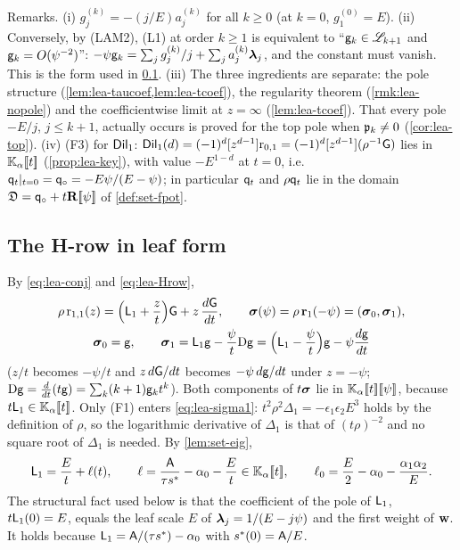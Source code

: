 Remarks. (i) $g_j^{(k)} = -(j/E)a_j^{(k)}$ for all $k\geq 0$ (at $k = 0$, $g_1^{(0)} = E$). (ii) Conversely, by (LAM2), (L1) at order $k\geq 1$ is equivalent to ``$\mathsf{g}_k\in\mathscr{L}_{k+1}$ and $\mathsf{g}_k = O(\psi^{-2})$'': $-\psi\mathsf{g}_k = \sum_jg_j^{(k)}/j + \sum_ja_j^{(k)}\boldsymbol{\lambda}_j$, and the constant must vanish. This is the form used in \cref{sec:lea-sigma}. (iii) The three ingredients are separate: the pole structure (\cref{lem:lea-taucoef,lem:lea-tcoef}), the regularity theorem (\cref{rmk:lea-nopole}) and the coefficientwise limit at $z = \infty$ (\cref{lem:lea-tcoef}). That every pole $-E/j$, $j\leq k+1$, actually occurs is proved for the top pole when $\mathfrak{p}_k\neq 0$ (\cref{cor:lea-top}). (iv) (F3) for $\mathsf{Dil}_1$: $\mathsf{Dil}_1(d) = (-1)^d[z^{d-1}]\mathrm{r}_{0,1} = (-1)^d[z^{d-1}](\rho^{-1}\mathsf{G})$ lies in $\mathbb{K}_{\alpha}[\![ t ]\!]$ (\cref{prop:lea-key}), with value $-E^{1-d}$ at $t = 0$, i.e.\ $\mathsf{q}_{t}|_{t=0} = \mathsf{q}_{\circ} = -E\psi/(E-\psi)$; in particular $\mathsf{q}_{t}$ and $\rho\mathsf{q}_{t}$ lie in the domain $\mathfrak{D} = \mathsf{q}_{\circ} + t\mathbf{R}[\![ \psi ]\!]$ of \cref{def:set-fpot}.

\subsection{The H-row in leaf form}
\label{sec:lea-sigma}

By \eqref{eq:lea-conj} and \eqref{eq:lea-Hrow},
\begin{equation}
\label{eq:lea-sigma1}
\begin{gathered}
\rho\,\mathrm{r}_{1,1}(z) = \Bigl(\mathsf{L}_1+\frac{z}{t}\Bigr)\mathsf{G} + z\,\frac{d\mathsf{G}}{dt},\qquad
\boldsymbol{\sigma}(\psi) = \rho\,\mathbf{r}_1(-\psi) = (\boldsymbol{\sigma}_0,\boldsymbol{\sigma}_1),\\
\boldsymbol{\sigma}_0 = \mathsf{g},\qquad \boldsymbol{\sigma}_1 = \mathsf{L}_1\mathsf{g} - \frac{\psi}{t}\mathrm{D}\mathsf{g} = \Bigl(\mathsf{L}_1-\frac{\psi}{t}\Bigr)\mathsf{g} - \psi\frac{d\mathsf{g}}{dt}
\end{gathered}
\end{equation}
($z/t$ becomes $-\psi/t$ and $z\,d\mathsf{G}/dt$ becomes $-\psi\,d\mathsf{g}/dt$ under $z = -\psi$; $\mathrm{D}\mathsf{g} = \frac{d}{dt}(t\mathsf{g}) = \sum_k(k+1)\mathsf{g}_kt^k$). Both components of $t\boldsymbol{\sigma}$ lie in $\mathbb{K}_{\alpha}[\![ t ]\!][\![ \psi ]\!]$, because $t\mathsf{L}_1\in\mathbb{K}_{\alpha}[\![ t ]\!]$. Only (F1) enters \eqref{eq:lea-sigma1}: $t^2\rho^2\Delta_1 = -\epsilon_1\epsilon_2E^3$ holds by the definition of $\rho$, so the logarithmic derivative of $\Delta_1$ is that of $(t\rho)^{-2}$ and no square root of $\Delta_1$ is needed. By \cref{lem:set-eig},
\begin{equation}
\label{eq:lea-L1exp}
\mathsf{L}_1 = \frac{E}{t} + \ell(t),\qquad \ell = \frac{\mathsf{A}}{\tau s^{\ast}} - \alpha_0 - \frac{E}{t}\in\mathbb{K}_{\alpha}[\![ t ]\!],\qquad \ell_0 = \frac{E}{2} - \alpha_0 - \frac{\alpha_1\alpha_2}{E}.
\end{equation}
The structural fact used below is that the coefficient of the pole of $\mathsf{L}_1$, $t\mathsf{L}_1(0) = E$, equals the leaf scale $E$ of $\boldsymbol{\lambda}_j = 1/(E-j\psi)$ and the first weight of $\mathbf{w}$. It holds because $\mathsf{L}_1 = \mathsf{A}/(\tau s^{\ast}) - \alpha_0$ with $s^{\ast}(0) = \mathsf{A}/E$.

